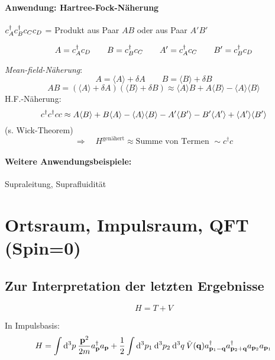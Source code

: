 \documentclass[11pt,a4paper]{report}
\begin{document}
\paragraph{Anwendung: Hartree-Fock-Näherung}\mbox{}\par 

$c^\dagger_{A}c^\dagger_{B}c_{C}c_{D}$ = Produkt aus Paar $AB$ oder aus Paar $A'B'$

$$A=c^\dagger_{A}c_{D}\qquad B = c^\dagger_{B}c_{C}\qquad A'=c^\dagger_{A}c_{C}\qquad B'=c^\dagger_{B}c_{D}$$

\newcommand{\erw}[1]{\langle #1\rangle}

\textit{Mean-field-Näherung}:
$$A=\erw{A}+\delta A\qquad B=\erw{B}+\delta B$$
$$AB = (\erw{A}+\delta A)(\erw{B}+\delta B) \approx \erw{A}B + A\erw{B} - \erw{A}\erw{B}$$
H.F.-Näherung:
$$\createf{}\createf{}cc \approx A\erw{B}+B\erw{A}-\erw{A}\erw{B}-A'\erw{B'}-B'\erw{A'}+\erw{A'}\erw{B'}$$
(s. Wick-Theorem)
$$\Rightarrow\quad H^{\text{genähert}}\approx \text{Summe von Termen }\sim c^\dagger c$$

\paragraph{Weitere Anwendungsbeispiele:} Supraleitung, Suprafluidität

\section{Ortsraum, Impulsraum, QFT (Spin=0)}

\subsection{Zur Interpretation der letzten Ergebnisse}

$$H=T+V$$

In Impulsbasis:
$$H=\int\mathrm{d}^3p\:\frac{\mathbf{p}^2}{2m}a_{\mathbf{p}}^\dagger a_{\mathbf{p}}+\frac{1}{2}\int\mathrm{d}^3p_1\:\mathrm{d}^3p_2\:\mathrm{d}^3q\: \tilde{V}(\mathbf{q})a_{\mathbf{p}_1-\mathbf{q}}^\dagger a_{\mathbf{p}_2+\mathbf{q}}^\dagger a_{\mathbf{p}_2}a_{\mathbf{p}_1}$$
\end{document}

